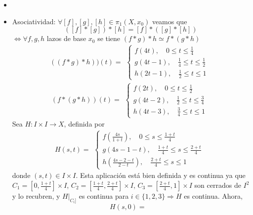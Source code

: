\begin{dem}
  \begin{itemize}
    \item []
    \item Asociatividad: $\forall [f], [g], [h] \in \pi_{1}(X, x_{0})$ veamos que 
      \[ 
        ([f] * [g]) * [h] = [f] * ([g] * [h]) 
      \]  
      $\Leftrightarrow \forall f,g,h$ lazos de base $x_{0}$ se tiene $(f * g) * h \simeq f * (g * h)$
      \[ 
        ((f * g) * h))(t) =
        \begin{aligned}
          \begin{cases}
            f(4t), \quad 0 \leq t \leq \frac{1}{4} \\
            g(4t - 1), \quad \frac{1}{4} \leq t \leq \frac{1}{2} \\
            h(2t - 1), \quad \frac{1}{2} \leq t \leq 1
          \end{cases}
        \end{aligned} 
      \] 
      \[ 
        (f * (g * h))(t) =
        \begin{aligned}
          \begin{cases}
            f(2t), \quad 0 \leq t \leq \frac{1}{2} \\
            g(4t - 2), \quad \frac{1}{2} \leq t \leq \frac{3}{4} \\
            h(4t - 3), \quad \frac{3}{4} \leq t \leq 1
          \end{cases}
        \end{aligned} 
      \] 
      Sea $H : I \times I \to X$, definida por
      \[ 
        H(s,t) =
        \begin{aligned}
          \begin{cases}
            f(\frac{4s}{1 + t}), \quad 0 \leq s \leq \frac{1 + t}{4} \\
            g(4s -1 -t), \quad \frac{1 + t}{4} \leq s \leq \frac{2 + t}{4} \\
            h(\frac{4s - 2 - t}{2 - t}), \quad \frac{2 + t}{4} \leq s \leq 1
          \end{cases}
        \end{aligned}
      \] 
    donde $(s, t) \in I \times I$. Esta aplicación está bien definida y es continua ya que $C_{1} = [0, \frac{1 + t}{4}] \times I$, $C_{2} = [\frac{1 + t}{4}, \frac{2 + t}{4}] \times I$, $C_{3} = [\frac{2 + t}{4}, 1] \times I$ son cerrados de $I^{2}$ y lo recubren, y $H|_{C_{i}]}$ es continua para $i \in \{ 1, 2, 3 \} \Rightarrow H$ es continua. Ahora,
    \[ 
      H(s,0) =
      \begin{aligned}

\end{aligned}\]
\end{itemize}
\end{dem}
